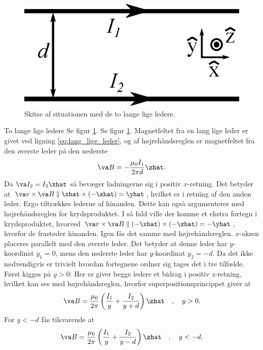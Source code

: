 \begin{figure}
    \centering
    \includegraphics[width=.5\columnwidth]{facit/figurer/elektro/to_lange_lige_leder.eps}
    \caption{Skitse af situationen med de to lange lige ledere.}
    \label{fig:to_lange_lige_ledere}
\end{figure}
\begin{opgave}{To lange lige ledere}
    \opg Se figur \ref{fig:to_lange_lige_ledere}.
    \opg Se figur \ref{fig:to_lange_lige_ledere}.
    \opg Magnetfeltet fra en lang lige leder er givet ved ligning \eqref{eq:lang_lige_leder}, og af højrehåndsreglen er magnetfeltet fra den øverste leder på den nederste
    \begin{align*}
        \va B = -\frac{\mu_0I_1}{2\pi d}\zhat.
    \end{align*}
    \opg Da $\va I_2 = I_2\xhat$ så bevæger ladningerne sig i positiv $x$-retning. Det betyder at $\va v \times \va B \parallel \xhat \times (-\zhat) = \yhat$, hvilket er i retning af den anden leder. Ergo tiltrækkes lederne af hinanden. Dette kan også argumenteres med højrehåndsreglen for krydsproduktet.
    \opg I så fald ville der komme et ekstra fortegn i krydsproduktet, hvorved $\va v \times \va B \parallel (-\xhat) \times (-\zhat) = -\yhat$, hvorfor de frastøder hinanden. Igen fås det samme med højrehåndsreglen.
    \opg $x$-aksen placeres parallelt med den øverste leder. Det betyder at denne leder har $y$-koordinat $y_1 = 0$, mens den nederste leder har $y$-koordinat $y_2 = -d$. Da det ikke nødvendigvis er trivielt hvordan fortegnene ordner sig tages det i tre tilfælde. Først kigges på $y>0$: Her er giver begge ledere et bidrag i positiv $z$-retning, hvilket kan ses med højrehåndsreglen, hvorfor superpositionsprincippet giver at
    \begin{align*}
        \va B = \frac{\mu_0}{2\pi}\left(\frac{I_1}{y} + \frac{I_2}{y+d}\right)\zhat \quad , \quad y > 0.
    \end{align*}
    For $y<-d$ fås tilsvarende at
    \begin{align*}
        \va B = \frac{\mu_0}{2\pi}\left(\frac{I_1}{y} + \frac{I_2}{y-d}\right)\zhat \quad , \quad y < -d.
    \end{align*}

\end{opgave}
